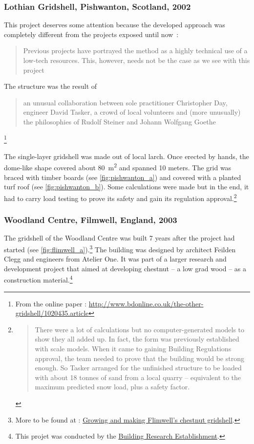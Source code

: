 \subsubsection{Lothian Gridshell, Pishwanton, Scotland, 2002}
This project deserves some attention because the developed approach was completely different from the projects exposed until now~: \blockcquote[]{Lowenstein2002}{Previous projects have portrayed the method as a highly technical use of a low-tech resources. This, however, needs not be the case as we see with this project \belp{}}. The structure was the result of \blockcquote[]{bdonline2002}{\belp{} an unusual collaboration between sole practitioner Christopher Day, engineer David Tasker, a crowd of local volunteers and (more unusually) the philosophies of Rudolf Steiner and Johann Wolfgang Goethe}.\footnote{From the online paper  : \url{http://www.bdonline.co.uk/the-other-gridshell/1020435.article}}

The single-layer gridshell was made out of local larch. Once erected by hands, the dome-like shape covered about \SI{80}{m^2} and spanned 10 meters. The grid was braced with timber boards (see \cref{fig:pishwanton_a}) and covered with a planted turf roof (see \cref{fig:pishwanton_b}). Some calculations were made but in the end, it had to carry load testing to prove its safety and gain its regulation approval.\footnote{\blockcquote[]{bdonline2002}{There were a lot of calculations but no computer-generated models to show they all added up. In fact, the form was previously established with scale models. When it came to gaining Building Regulations approval, the team needed to prove that the building would be strong enough. So Tasker arranged for the unfinished structure to be loaded with about 18 tonnes of sand from a local quarry – equivalent to the maximum predicted snow load, plus a safety factor.}}

\subsubsection{Woodland Centre, Filmwell, England, 2003}
The gridshell of the Woodland Centre was built 7 years after the project had started (see \cref{fig:flimwell_a}).\footnote{More to be found at : \href{http://www.fourthdoor.org/annular/?page_id=441}{Growing and making Flimwell’s chestnut gridshell}.} The building was designed by architect Feilden Clegg and engineers from Atelier One. It was part of a larger research and development project that aimed at developing chestnut -- a low grad wood -- as a construction material.\footnote{This projet was conducted by the \href{http://www.bre.co.uk/}{Building Research Establishment}.}

